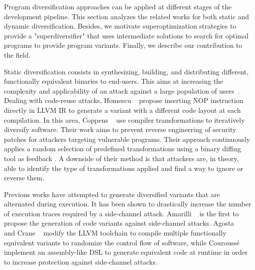 

Program diversification approaches can be applied at different stages of the development pipeline. This section analyzes the related works for both static and dynamic diversification. Besides, we motivate superoptimization strategies to provide a "superdiversifier" that uses intermediate solutions to search for optimal programs to provide program variants. Finally, we describe our contribution to the field.


Static diversification consists in synthesizing, building, and distributing different, functionally equivalent binaries to end-users. This aims at increasing the complexity and applicability of an attack against a large population of users~\cite{cohen1993operating}. 
Dealing with code-reuse attacks, Homescu \etal~\cite{homescu2013profile} propose inserting NOP instruction directly in LLVM IR to generate a variant with a different code layout at each compilation. 
In this area, Coppens \etal~\cite{coppens2013feedback} use compiler transformations to iteratively diversify software.
Their work aims to prevent reverse engineering of security patches for attackers targeting vulnerable programs.
Their approach continuously applies a random selection of predefined transformations using a binary diffing tool as feedback \citationneeded.
A downside of their method is that attackers are, in theory, able to identify the type of transformations applied and find a way to ignore or reverse them.

Previous works have attempted to generate diversified variants that are alternated during execution.
It has been shown to drastically increase the number of execution traces required by a side-channel attack.
Amarilli \etal~\cite{amarilli2011can} is the first to propose the generation of code variants against side-channel attacks.
Agosta \etal~\cite{agosta2015meet} and Crane \etal~\cite{crane2015thwarting}
modify the LLVM toolchain to compile multiple functionally equivalent variants to randomize the control flow of software,
while Courouss{\'e} \etal~\cite{courousse2016runtime} implement an assembly-like DSL to generate equivalent code at runtime in order to increase protection against side-channel attacks. 


